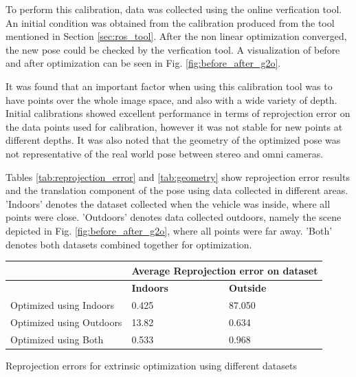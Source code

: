 To perform this calibration, data was collected using the online verfication tool.  An initial condition was obtained from the calibration produced from the tool mentioned in Section \ref{sec:ros_tool}.  After the non linear optimization converged, the new pose could be checked by the verfication tool.  A visualization of before and after optimization can be seen in Fig. \ref{fig:before_after_g2o}. 

It was found that an important factor when using this calibration tool was to have points over the whole image space, and also with a wide variety of depth.  Initial calibrations showed excellent performance in terms of reprojection error on the data points used for calibration, however it was not stable for new points at different depths.  It was also noted that the geometry of the optimized pose was not representative of the real world pose between stereo and omni cameras.  

Tables \ref{tab:reprojection_error} and \ref{tab:geometry} show reprojection error results and the translation component of the pose using data collected in different areas.  'Indoors' denotes the dataset collected when the vehicle was inside, where all points were close. 'Outdoors' denotes data collected outdoors, namely the scene depicted in Fig. \ref{fig:before_after_g2o}, where all points were far away.  'Both' denotes both datasets combined together for optimization.

\begin{center}
    \begin{tabular}{ |p{6cm}|p{3cm}|p{3cm}| }%
    \hline
    & \multicolumn{2}{c|}{\bf{Average Reprojection error on dataset}}  \\ \hline
    & \bf{Indoors} & \bf{Outside} \\ \hline
    Optimized using Indoors & 0.425 & 87.050 \\ \hline
    Optimized using Outdoors & 13.82 & 0.634 \\ \hline
    Optimized using Both & 0.533 & 0.968 \\
    \hline 
    \end{tabular}
   {Reprojection errors for extrinsic optimization using different datasets} 
  \label{tab:reprojection_error}
\end{center}

